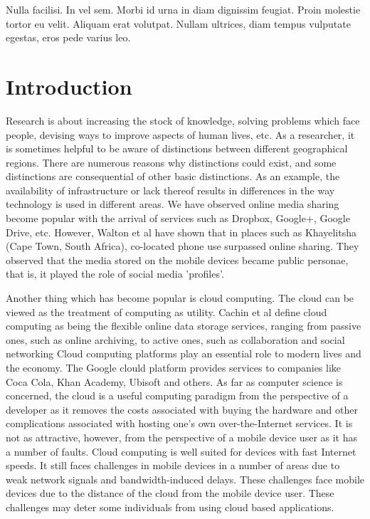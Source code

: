 \begin{savequote}[75mm] 
Nulla facilisi. In vel sem. Morbi id urna in diam dignissim feugiat. Proin molestie tortor eu velit. Aliquam erat volutpat. Nullam ultrices, diam tempus vulputate egestas, eros pede varius leo.
\end{savequote}

\chapter{Introduction}
Research is about increasing the stock of knowledge, solving problems which face people, devising ways to improve aspects of human lives, etc. As a researcher, it is sometimes helpful to be aware of distinctions
between different geographical regions. There are numerous reasons why distinctions could exist, and some distinctions are consequential of other basic distinctions. As
an example, the availability of
infrastructure or lack thereof results in differences in the way technology is used in different areas. We have observed online media sharing become
popular with the arrival of services such as Dropbox, Google+, Google Drive, etc. However, Walton et al\cite{RefWorks:26} have shown that in places such as
Khayelitsha (Cape Town, South Africa), co-located phone use surpassed online sharing. They observed that the media stored on the mobile devices became public personae, that is, it played the role of social media 'profiles'\cite[p. 403]{RefWorks:26}.\newline

Another thing which has become popular is cloud computing. The cloud can be viewed as the treatment of computing as utility. Cachin et al\cite{cachin2009trusting} define cloud computing as being the flexible online data storage services, ranging from passive ones, such as online archiving, to active ones, such as collaboration and social networking \cite[p. 81]{cachin2009trusting}
Cloud computing platforms play an essential role to modern lives and the economy. The Google clould platform provides services to companies like Coca Cola, Khan Academy, Ubisoft and others. As far as computer science is concerned, the cloud is a useful computing paradigm from the perspective of a developer
as it removes the costs associated with buying the hardware and other complications associated with hosting one's own over-the-Internet services. It is not as attractive, however, from the perspective of a mobile device user as it has a number of faults. Cloud computing is well suited for devices with fast Internet speeds. It still faces challenges in mobile devices in a number of areas due to weak
network signals and bandwidth-induced delays. These challenges face mobile devices due to the distance of the cloud from the mobile device user. These
challenges may deter some individuals from using cloud based applications.\newline

